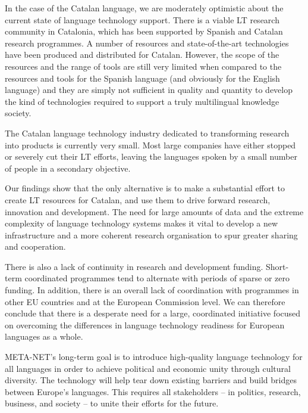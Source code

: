 \begin{multicols}{2}
    In the case of the Catalan language, we are moderately optimistic about the current state of language technology support. There is a viable LT research community in Catalonia, which has been supported by Spanish and Catalan research programmes. A number of resources and state-of-the-art technologies have been produced and distributed for Catalan. However, the scope of the resources and the range of tools are still very limited when compared to the resources and tools for the Spanish language (and obviously for the English language) and they are simply not sufficient in quality and quantity to develop the kind of technologies required to support a truly multilingual knowledge society.

    The Catalan language technology industry dedicated to transforming research into products is currently very small. Most large companies have either stopped or severely cut their LT efforts, leaving the languages spoken by a small number of people in a secondary objective.

    Our findings show that the only alternative is to make a substantial effort to create LT resources for Catalan, and use them to drive forward research, innovation and development. The need for large amounts of data and the extreme complexity of language technology systems makes it vital to develop a new infrastructure and a more coherent research organisation to spur greater sharing and cooperation.

    There is also a lack of continuity in research and development funding. Short-term coordinated programmes tend to alternate with periods of sparse or zero funding. In addition, there is an overall lack of coordination with programmes in other EU countries and at the European Commission level. We can therefore conclude that there is a desperate need for a large, coordinated initiative focused on overcoming the differences in language technology readiness for European languages as a whole.

    META-NET’s long-term goal is to introduce high-quality language technology for all languages in order to achieve political and economic unity through cultural diversity. The technology will help tear down existing barriers and build bridges between Europe’s languages. This requires all stakeholders -- in politics, research, business, and society -- to unite their efforts for the future. 
\end{multicols}


\clearpage

